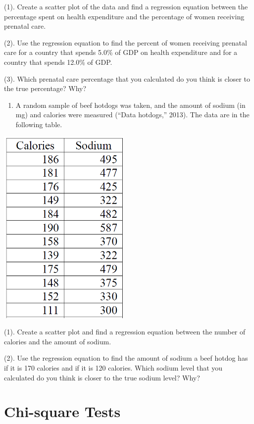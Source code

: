 \documentclass[
]{book}
\providecommand{\tightlist}{%
  \setlength{\itemsep}{0pt}\setlength{\parskip}{0pt}}
\begin{document}
(1). Create a scatter plot of the data and find a regression equation between the percentage spent on health expenditure and the percentage of women receiving prenatal care.

(2). Use the regression equation to find the percent of women
receiving prenatal care for a country that spends 5.0\% of GDP on health expenditure and for a country that spends 12.0\% of GDP.

(3). Which prenatal care percentage that you calculated do you think is closer to the true percentage? Why?

\begin{enumerate}
\def\labelenumi{\arabic{enumi}.}
\setcounter{enumi}{2}
\tightlist
\item
  A random sample of beef hotdogs was taken, and the amount of sodium (in mg) and calories were measured (``Data hotdogs,'' 2013). The data are in the following table.
\end{enumerate}

\begin{center}\includegraphics[width=0.5\linewidth]{week12/ex03} \end{center}

(1). Create a scatter plot and find a regression equation between the number of calories and the amount of sodium.

(2). Use the regression equation to find the amount of sodium a beef hotdog has if it is 170 calories and if it is 120 calories. Which sodium level that you calculated do you think is closer to the true sodium level? Why?

\hypertarget{chi-square-tests}{%
\chapter{Chi-square Tests}\label{chi-square-tests}}
\end{document}
